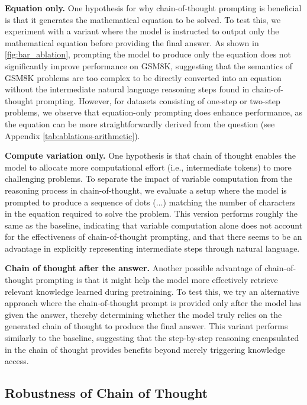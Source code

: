 \textbf{Equation only.} One hypothesis for why chain-of-thought prompting is beneficial is that it generates the mathematical equation to be solved. To test this, we experiment with a variant where the model is instructed to output only the mathematical equation before providing the final answer. As shown in \cref{fig:bar_ablation}, prompting the model to produce only the equation does not significantly improve performance on GSM8K, suggesting that the semantics of GSM8K problems are too complex to be directly converted into an equation without the intermediate natural language reasoning steps found in chain-of-thought prompting. However, for datasets consisting of one-step or two-step problems, we observe that equation-only prompting does enhance performance, as the equation can be more straightforwardly derived from the question (see Appendix \cref{tab:ablations-arithmetic}).

  
\textbf{Compute variation only.} One hypothesis is that chain of thought enables the model to allocate more computational effort (i.e., intermediate tokens) to more challenging problems. To separate the impact of variable computation from the reasoning process in chain-of-thought, we evaluate a setup where the model is prompted to produce a sequence of dots ($\ldots$) matching the number of characters in the equation required to solve the problem. This version performs roughly the same as the baseline, indicating that variable computation alone does not account for the effectiveness of chain-of-thought prompting, and that there seems to be an advantage in explicitly representing intermediate steps through natural language.

\textbf{Chain of thought after the answer.} Another possible advantage of chain-of-thought prompting is that it might help the model more effectively retrieve relevant knowledge learned during pretraining. To test this, we try an alternative approach where the chain-of-thought prompt is provided only after the model has given the answer, thereby determining whether the model truly relies on the generated chain of thought to produce the final answer. This variant performs similarly to the baseline, suggesting that the step-by-step reasoning encapsulated in the chain of thought provides benefits beyond merely triggering knowledge access.

  
\subsection{Robustness of Chain of Thought}\label{subsec:robustness}

